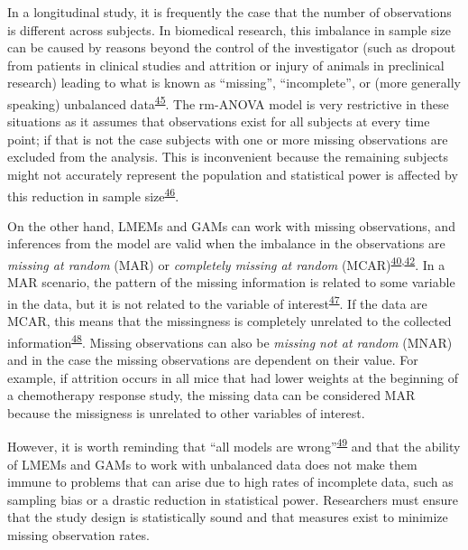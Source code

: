\documentclass[
]{article}
\begin{document}
In a longitudinal study, it is frequently the case that the number of observations is different across subjects. In biomedical research, this imbalance in sample size can be caused by reasons beyond the control of the investigator (such as dropout from patients in clinical studies and attrition or injury of animals in preclinical research) leading to what is known as ``missing'', ``incomplete'', or (more generally speaking) unbalanced data\textsuperscript{\protect\hyperlink{ref-molenberghs2004}{45}}. The rm-ANOVA model is very restrictive in these situations as it assumes that observations exist for all subjects at every time point; if that is not the case subjects with one or more missing observations are excluded from the analysis. This is inconvenient because the remaining subjects might not accurately represent the population and statistical power is affected by this reduction in sample size\textsuperscript{\protect\hyperlink{ref-ma2012}{46}}.

On the other hand, LMEMs and GAMs can work with missing observations, and inferences from the model are valid when the imbalance in the observations are \emph{missing at random} (MAR) or \emph{completely missing at random} (MCAR)\textsuperscript{\protect\hyperlink{ref-west2014}{40},\protect\hyperlink{ref-weiss2005}{42}}. In a MAR scenario, the pattern of the missing information is related to some variable in the data, but it is not related to the variable of interest\textsuperscript{\protect\hyperlink{ref-scheffer2002}{47}}. If the data are MCAR, this means that the missingness is completely unrelated to the collected information\textsuperscript{\protect\hyperlink{ref-potthoff2006}{48}}. Missing observations can also be \emph{missing not at random} (MNAR) and in the case the missing observations are dependent on their value. For example, if attrition occurs in all mice that had lower weights at the beginning of a chemotherapy response study, the missing data can be considered MAR because the missigness is unrelated to other variables of interest.

However, it is worth reminding that ``all models are wrong''\textsuperscript{\protect\hyperlink{ref-box1976}{49}} and that the ability of LMEMs and GAMs to work with unbalanced data does not make them immune to problems that can arise due to high rates of incomplete data, such as sampling bias or a drastic reduction in statistical power. Researchers must ensure that the study design is statistically sound and that measures exist to minimize missing observation rates.
\end{document}
